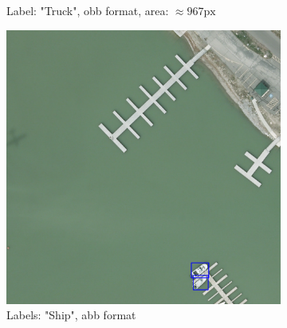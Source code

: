 \begin{figure}[h]
\begin{subfigure}[b]{0.45\textwidth}
        \caption{Label: "Truck", obb format, area: $\approx 967 \text{px}$}
        \label{fig:obb_truck}
    \end{subfigure}
    
    \vspace{0.5cm} %
    
    \begin{subfigure}[b]{0.45\textwidth}
        \centering
        \includegraphics[trim={680pt 50pt 250pt 865pt},clip,width=\textwidth]{images/015Results/01abb_vs_obb/abb_ship.png}
        \caption{Labels: "Ship", abb format}
        \label{fig:abb_ship}
    \end{subfigure}
    \hfill
    \begin{subfigure}[b]{0.45\textwidth}
        \centering

\end{subfigure}
\end{figure}
